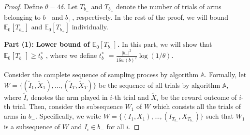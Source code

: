 \documentclass{article}
\newcommand{\E}{\mathbb E}
\begin{document}
\begin{proof}
Define $\theta=4\delta$.
Let $T_{b_-}$ and $T_{b_+}$ denote the number of trials of arms belonging to $b_-$ and $b_+$, respectively. 
In the rest of the proof, we will bound $\E_0[T_{b_-}]$ and $\E_0[T_{b_+}]$ individually.



\textbf{Part (1): Lower bound of $\E_0[T_{b_-}]$.}
In this part, we will show that $\E_0[T_{b_-}]\ge t_{b_-}^*$, where we define $t_{b_-}^* = \frac{|b_-|^2}{16 w(b)^2}\log(1/\theta)$.

Consider the complete sequence of sampling process by algorithm $\mathbb A$.
Formally, let $W=\{(\tilde I_1,\tilde X_1),\ldots, (\tilde I_T, \tilde X_T)\}$ be the sequence of all trials by algorithm $\mathbb A$, where $\tilde I_i$ denotes the arm played in $i$-th trial and $\tilde X_i$ be the reward outcome of $i$-th trial.
Then, consider the subsequence $W_1$ of $W$ which consists all the trials of arms in $b_-$.
Specifically, we write $W=\{(I_1,X_1),\ldots,(I_{T_{b_-}}, X_{T_{b_-}})\}$ such that $W_1$ is a subsequence of $W$ and $I_i \in b_-$ for all $i$.


\end{proof}
\end{document}
